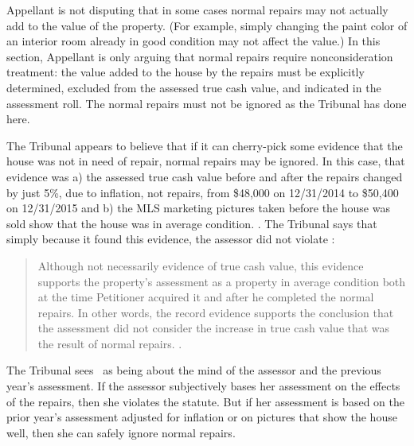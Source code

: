 \documentclass[12pt,\documentclassflag]{michiganCourtOfAppealsBrief}
\begin{document}
Appellant is not disputing that in some cases normal repairs may not actually add to the value of the property. (For example, simply changing the paint color of an interior room already in good condition may not affect the value.) In this section, Appellant is only arguing that normal repairs require nonconsideration treatment: the value added to the house by the repairs must be explicitly determined, excluded from the assessed true cash value, and indicated in the assessment roll. The normal repairs must not be ignored as the Tribunal has done here.

The Tribunal appears to believe that if it can cherry-pick some evidence that the house was not in need of repair, normal repairs may be ignored.
In this case, that evidence was a) the assessed true cash value before and after the repairs changed by just 5\%, due to inflation, not repairs,
from \$48,000 on 12/31/2014 to \$50,400 on 12/31/2015 and
b) the MLS marketing pictures taken before the house was sold show that the house was in average condition. \reconsiderationDenied[2]. The Tribunal says that simply because it found this evidence, the assessor did not violate \mathieuGast:

\begin{quote}
	Although not necessarily evidence of true cash value, this evidence supports the property's assessment as a property in average condition both at the time Petitioner acquired it and after he completed the normal repairs. In other words, the record evidence supports the conclusion that the assessment did not consider the increase in true cash value that was the result of normal repairs. \reconsiderationDenied[2]. 
\end{quote}
 
The Tribunal sees \mathieuGast\ as being about the mind of the assessor and the previous year's assessment. If the assessor subjectively bases her assessment on the effects of the repairs, then she violates the statute. But if her assessment is based on the prior year's assessment adjusted for inflation or on pictures that show the house well, then she can safely ignore normal repairs.
\end{document}
